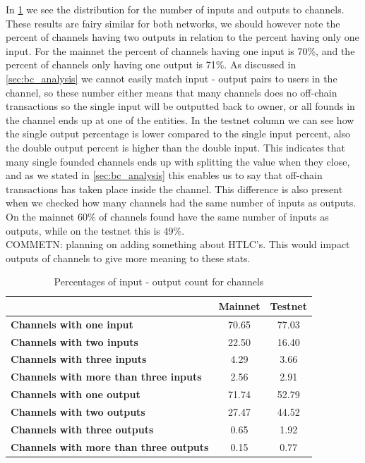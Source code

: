 In \cref{channel_input_output} we see the distribution for the number of inputs and outputs to channels. These results are fairy similar for both networks, we should however note the percent of channels having two outputs in relation to the percent having only one input. For the mainnet the percent of channels having one input is 70\%, and the percent of channels only having one output is 71\%. As discussed in \cref{sec:bc_analysis} we cannot easily match input - output pairs to users in the channel, so these number either means that many channels does no off-chain transactions so the single input will be outputted back to owner, or all founds in the channel ends up at one of the entities. In the testnet column we can see how the single output percentage is lower compared to the single input percent, also the double output percent is higher than the double input. This indicates that many single founded channels ends up with splitting the value when they close, and as we stated in \cref{sec:bc_analysis} this enables us to say that off-chain transactions has taken place inside the channel.
This difference is also present when we checked how many channels had the same number of inputs as outputs. On the mainnet 60\% of channels found have the same number of inputs as outputs, while on the testnet this is 49\%. 
\\

COMMETN: planning on adding something about HTLC's. This would impact outputs of channels to give more meaning to these stats.
\begin{table}[]
\centering
\caption{Percentages of input - output count for channels}
\label{channel_input_output}
\begin{tabular}{|l|c|c|}
\hline
                                                                     & \textbf{Mainnet} & \textbf{Testnet} \\ \hline
\textbf{Channels with one input}             & 70.65            & 77.03            \\ \hline
\textbf{Channels with two inputs}            & 22.50            & 16.40            \\ \hline
\textbf{Channels with three inputs}          & 4.29             & 3.66             \\ \hline
\textbf{Channels with more than three inputs} & 2.56             & 2.91             \\ \hline
\textbf{Channels with one output}             & 71.74            & 52.79            \\ \hline
\textbf{Channels with two outputs}             & 27.47            & 44.52            \\ \hline
\textbf{Channels with three outputs}          & 0.65             & 1.92             \\ \hline
\textbf{Channels with more than three outputs} & 0.15             & 0.77             \\ \hline
\end{tabular}
\end{table}

